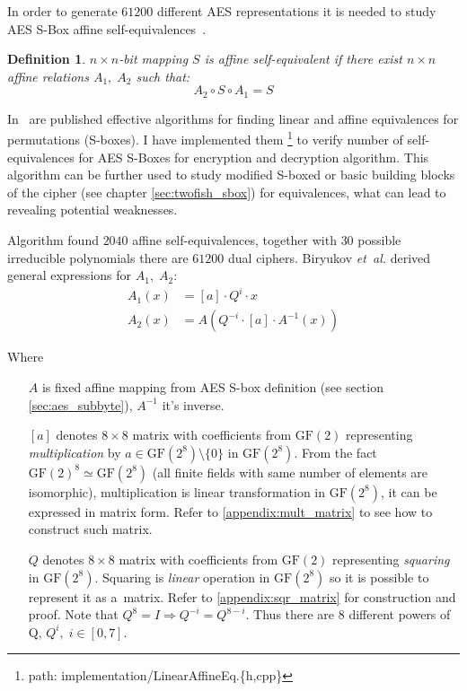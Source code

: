 \documentclass[11pt,oneside,final]{fithesis2}
\newtheorem{mydef}{Definition}
\newcommand{\gfe}{\ensuremath{\text{GF}\left(2^8\right)}}
\newcommand{\gf}{\ensuremath{\text{GF}\left(2\right)}}
\begin{document}
	In order to generate $61200$ different AES representations it is needed to study AES S-Box affine self-equivalences~\citep{Biryukov:2003:TCL:1766171.1766175}. 
		
	\begin{mydef}
	$n \times n$-bit mapping $S$ is affine self-equivalent if there exist $n \times n$ affine relations $A_1,\;A_2$ such that: 
	\begin{equation}\label{eq:selfeq}
	A_2 \circ S \circ A_1 = S 
	\end{equation}
	\end{mydef}
	
	In~\citep{Biryukov:2003:TCL:1766171.1766175} are published effective algorithms for finding linear and affine equivalences for permutations (S-boxes). I have implemented
	them \footnote{path: implementation/LinearAffineEq.\{h,cpp\}} to verify number of self-equivalences for AES S-Boxes for encryption and decryption algorithm. 
	This algorithm can be further used to study modified S-boxed or basic building blocks of the cipher (see chapter \ref{sec:twofish_sbox}) for equivalences, what can lead
	to revealing potential weaknesses.
	
	Algorithm found $2040$ affine self-equivalences, together with $30$ possible irreducible polynomials there are $61200$ dual ciphers.
	Biryukov \emph{et~al.} derived general expressions for $A_1,\;A_2$:
	\begin{subequations}
	\begin{align}
	    A_1(x) &= \left[a\right] \cdot Q^i \cdot x\\
	    A_2(x) &= A\left( Q^{-i} \cdot \left[a\right] \cdot A^{-1}\left(x\right) \right)
	\end{align}
	\end{subequations}
	
	Where
	\begin{itemize}[leftmargin=5em]
	 \item[{$A$}] is fixed affine mapping from AES S-box definition (see section \ref{sec:aes_subbyte}), $A^{-1}$ it's inverse.
	 \item[{$[a]$}] denotes $8 \times 8$ matrix with coefficients from $\gf$ representing \emph{multiplication} by $a \in \gfe \setminus \{0\}$ in $\gfe$. 
	    From the fact $\gf^8 \simeq \gfe$ (all finite fields with same number of elements are isomorphic), multiplication is
	    linear transformation in $\gfe$, it can be expressed in matrix form. Refer to \ref{appendix:mult_matrix} to see how to construct such matrix.
	 \item[{$Q$}] denotes $8 \times 8$ matrix with coefficients from $\gf$ representing \emph{squaring} in $\gfe$. Squaring is \emph{linear} operation
	    in $\gfe$ so it is possible to represent it as a~matrix. Refer to \ref{appendix:sqr_matrix} for construction and proof. Note that 
	    $Q^8 = I \Rightarrow Q^{-i} = Q^{8-i}$. Thus there are 8 different powers of Q, $Q^{i}, \; i \in [0,7]$.
	\end{itemize}
	
\end{document}
